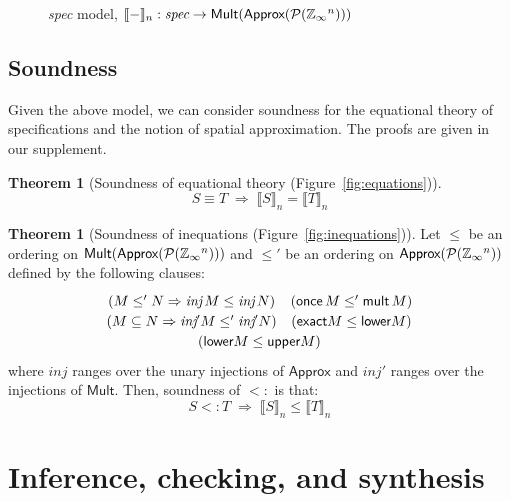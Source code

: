 \documentclass[9pt,preprint]{sigplanconf}
\newcounter{block}
\theoremstyle{definition}
\newtheorem{theorem}[block]{Theorem}
\newcommand{\interp}[1]{\llbracket{#1}\rrbracket}
\begin{document}
\begin{figure}

\caption{\textit{spec} model,
$\interp{-}_n : \textit{spec} \rightarrow \textsf{Mult}(\textsf{Approx}(\mathcal{P}(\domainVal{}^n)))$}
\label{fig:spatial-model}
\vspace{-0.75em}
\end{figure}

\subsection{Soundness}
%
Given the above model, we can
consider soundness for the equational theory of
specifications and the notion of spatial approximation. The proofs are given in our supplement.

\begin{theorem}[Soundness of equational theory (Figure~\ref{fig:equations})]
\[
S \equiv T \; \Rightarrow \;
\interp{S}_n = \interp{T}_n
\]
\end{theorem}

\begin{theorem}[Soundness of inequations
  (Figure~\ref{fig:inequations})] 

Let $\leq$ be an ordering on
$\textsf{Mult}(\textsf{Approx}(\mathcal{P}(\mathbb{Z}_\infty{}^n)))$
and $\leq'$ be an ordering on
$\textsf{Approx}(\mathcal{P}(\mathbb{Z}_\infty{}^n))$ defined by the
following clauses:
\begin{align*}
\def\arraystretch{1.2}
\begin{array}{c}
\begin{array}{cc}
(M \leq' N \Rightarrow \textit{inj} \, M \leq \textit{inj} \, N) &
(\textsf{once} \, M \leq' \textsf{mult} \, M) \\
(M \subseteq N \Rightarrow \textit{inj}' M \leq' \textit{inj}' N)
& (\textsf{exact} M \leq  \textsf{lower} M)
\end{array} \\ 
(\textsf{lower} M \leq  \textsf{upper} M)
\end{array}
\end{align*}
where $\textit{inj}$ ranges over the unary injections
of $\textsf{Approx}$ and $\textit{inj}'$ ranges over the injections of
$\textsf{Mult}$. Then, soundness of $<:$ is that:
\[
S <: T
\; \Rightarrow \;
\interp{S}_n \leq \interp{T}_n
\]
\end{theorem}

\section{Inference, checking, and synthesis}
\label{sec:analysis}
\end{document}

